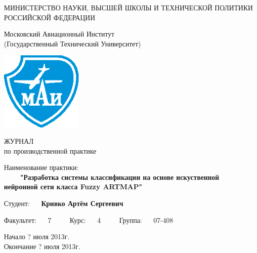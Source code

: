 \begin{titlepage}
\newpage

\begin{center}
	МИНИСТЕРСТВО НАУКИ, ВЫСШЕЙ ШКОЛЫ И ТЕХНИЧЕСКОЙ ПОЛИТИКИ \\
	РОССИЙСКОЙ ФЕДЕРАЦИИ
\end{center}


\begin{center}
	Московский Авиационный Институт\\
	(Государственный Технический Университет)
\end{center}

\vspace{2em}

\begin{center}
	\includegraphics[width=4cm]{mai.eps}
\end{center}

\begin{center}
	\large ЖУРНАЛ\\
	\large по производственной практике
\end{center}

\vspace{2em}


\begin{flushleft}
	Наименование практики: \\
	$\qquad$ \textbf{"Разработка системы классификации на основе искуственной нейронной сети класса Fuzzy ARTMAP"}
\end{flushleft}

\vspace{2em}

\begin{flushleft}
	Студент: $\quad$ \textbf{Кривко Артём Сергеевич}
\end{flushleft}

\vspace{2em}


\begin{flushleft}
	Факультет: $\quad$ 7 $\qquad$	Курс: $\quad$ 4 $\qquad$	Группа: $\quad$ 07-408 
\end{flushleft}


\vspace{4em}

\begin{center}
Начало ? июля 2013г.\\
Окончание ? июля 2013г.
\end{center}

\vspace{\fill}


\end{titlepage}
